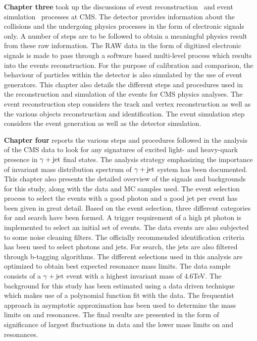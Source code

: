 \documentclass[12pt,a4]{article}
\begin{document}
\textbf{Chapter three} took up the discussions of event reconstruction~\cite{Lange:2011zza} and event simulation~\cite{robert2004monte} processes at CMS.
The detector provides information about the collisions
and the undergoing physics processes in the form of electronic signals only. A number of steps are to be followed to obtain a meaningful physics result from these
raw information.
The RAW data in the form of digitized electronic signals is made to pass through a software based multi-level process which results into the events reconstruction.
For the purpose of calibration and comparison, the behaviour of particles within the detector is also simulated by the use of event generators.
This chapter also details the different steps and procedures used in the reconstruction and simulation of the events for CMS physics analyses. The event reconstruction
step considers the track and vertex reconstruction as well as the various objects reconstruction and identification. The event simulation step considers the event
generation as well as the detector simulation.

\textbf{Chapter four} reports the various steps and procedures followed in the analysis of the CMS data to look for any signatures of excited light- and heavy-quark
presence in $\gamma+\mathrm{jet}$ final states. The analysis strategy emphasizing the importance of invariant mass distribution spectrum of $\gamma+\mathrm{jet}$ system has been documented.
This chapter also presents the detailed overview of the signals and backgrounds for this study,
along with the data and MC samples used. The event selection process to select the events
with a good photon and a good jet per event has been given in great detail. Based on the event selection, three different categories for \qstar and \bstar search have been
formed. A trigger requirement of a high pt photon is implemented to select an initial set of events. The data events are also subjected to some noise cleaning
filters. The officially recommended identification criteria has been used to select photons and jets. For \bstar search, the jets are also filtered through
b-tagging algorithms. The different selections used in this analysis are optimized to obtain best expected resonance mass limits.
The data sample consists of a $\gamma+\mathrm{jet}$ event
with a highest invariant mass of 4.6\unit{TeV}. The background for this study has been estimated using a data driven technique which makes use of a polynomial function
fit with the data. The frequentist approach in asymptotic approximation has been used to determine the mass limits on \qstar and \bstar resonances. The final results
are presented in the form of significance of largest fluctuations in data and the lower mass limits on \qstar and \bstar resonances. 
\end{document}
